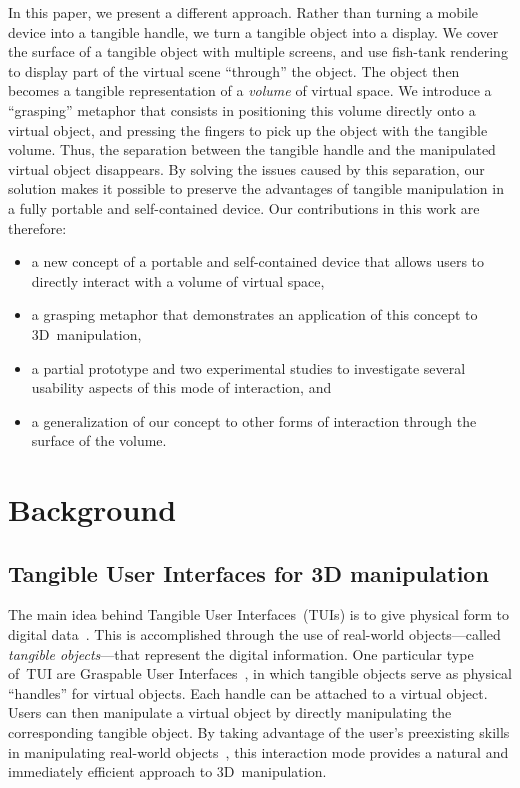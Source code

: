 \documentclass{vgtc}                         \havecopyrightspacefalse
\begin{document}
In this paper, we present a different approach. Rather than turning a mobile device into a tangible handle, we turn a tangible object into a display. We cover the surface of a tangible object with multiple screens, and use fish-tank rendering to display part of the virtual scene ``through'' the object. The object then becomes a tangible representation of a \emph{volume} of virtual space. We introduce a ``grasping'' metaphor that consists in positioning this volume directly onto a virtual object, and pressing the fingers to pick up the object with the tangible volume. Thus, the separation between the tangible handle and the manipulated virtual object disappears. By solving the issues caused by this separation, our solution makes it possible to preserve the advantages of tangible manipulation in a fully portable and self-contained device. Our contributions in this work are therefore:
\begin{itemize}[noitemsep,topsep=1mm]
\item a new concept of a portable and self-contained device that allows users to directly interact with a volume of virtual space,\\[-2.7mm]
\item a grasping metaphor that demonstrates an application of this concept to 3D~manipulation,\\[-2.7mm]
\item a partial prototype and two experimental studies to investigate several usability aspects of this mode of interaction, and\\[-2.7mm]
\item a generalization of our concept to other forms of interaction through the surface of the volume.
\end{itemize}

\section{Background}

\subsection{Tangible User Interfaces for 3D manipulation}

The main idea behind Tangible User Interfaces~(TUIs) is to give physical form to digital data~\cite{ishii08,ishii97}. This is accomplished through the use of real-world objects---called \emph{tangible objects}---that represent the digital information. One particular type of~TUI are Graspable User Interfaces~\cite{fitzmaurice96}, in which tangible objects serve as physical ``handles'' for virtual objects. Each handle can be attached to a virtual object. Users can then manipulate a virtual object by directly manipulating the corresponding tangible object. By taking advantage of the user's preexisting skills in manipulating real-world objects~\mbox{\cite{fitzmaurice96,ishii08}}, this interaction mode provides a natural and immediately efficient approach to 3D~manipulation.
\end{document}
